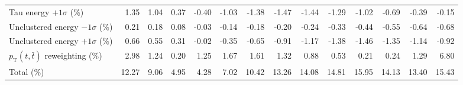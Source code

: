 \begin{table}[htbp]
{\begin{tabular}{lrrrrrrrrrrrrr}
Tau energy $+1\sigma$ (\%) & 1.35 & 1.04 & 0.37 & -0.40 & -1.03 & -1.38 & -1.47 & -1.44 & -1.29 & -1.02 & -0.69 & -0.39 & -0.15 \\ 
Unclustered energy $-1\sigma$ (\%) & 0.21 & 0.18 & 0.08 & -0.03 & -0.14 & -0.18 & -0.20 & -0.24 & -0.33 & -0.44 & -0.55 & -0.64 & -0.68 \\ 
Unclustered energy $+1\sigma$ (\%) & 0.66 & 0.55 & 0.31 & -0.02 & -0.35 & -0.65 & -0.91 & -1.17 & -1.38 & -1.46 & -1.35 & -1.14 & -0.92 \\ 
$p_\mathrm{T}(t,\bar{t})$ reweighting (\%) & 2.98 & 1.24 & 0.20 & 1.25 & 1.67 & 1.61 & 1.32 & 0.88 & 0.53 & 0.21 & 0.24 & 1.29 & 6.80 \\ 
\hline 
Total (\%) & 12.27  & 9.06  & 4.95  & 4.28  & 7.02  & 10.42  & 13.26  & 14.08  & 14.81  & 15.95  & 14.13  & 13.40  & 15.43 \\ 
\hline 
\end{tabular}
}
\end{table}
